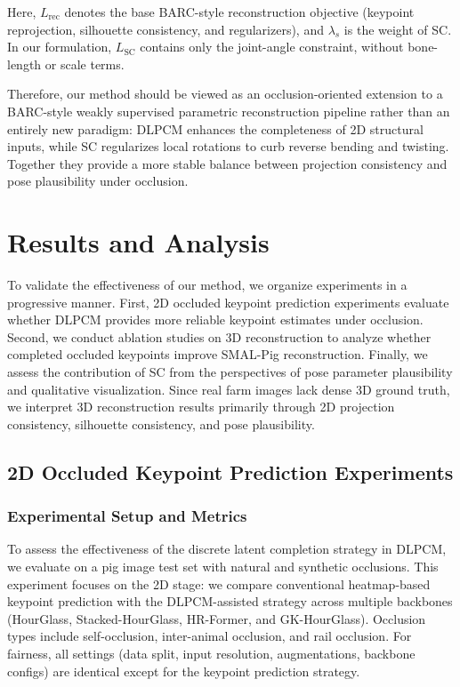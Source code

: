 \documentclass[computers,article,submit,pdftex,moreauthors]{Definitions/mdpi}
\begin{document}
Here, $L_{\text{rec}}$ denotes the base BARC-style reconstruction objective (keypoint reprojection, silhouette consistency, and regularizers), and $\lambda_s$ is the weight of SC. In our formulation, $L_{\text{SC}}$ contains only the joint-angle constraint, without bone-length or scale terms.

Therefore, our method should be viewed as an occlusion-oriented extension to a BARC-style weakly supervised parametric reconstruction pipeline rather than an entirely new paradigm: DLPCM enhances the completeness of 2D structural inputs, while SC regularizes local rotations to curb reverse bending and twisting. Together they provide a more stable balance between projection consistency and pose plausibility under occlusion.

\section{Results and Analysis}\label{sec:results}

To validate the effectiveness of our method, we organize experiments in a progressive manner. First, 2D occluded keypoint prediction experiments evaluate whether DLPCM provides more reliable keypoint estimates under occlusion. Second, we conduct ablation studies on 3D reconstruction to analyze whether completed occluded keypoints improve SMAL-Pig reconstruction. Finally, we assess the contribution of SC from the perspectives of pose parameter plausibility and qualitative visualization. Since real farm images lack dense 3D ground truth, we interpret 3D reconstruction results primarily through 2D projection consistency, silhouette consistency, and pose plausibility.

\subsection{2D Occluded Keypoint Prediction Experiments}\label{sec:2d_keypoint}

\subsubsection{Experimental Setup and Metrics}\label{sec:2d_setup}

To assess the effectiveness of the discrete latent completion strategy in DLPCM, we evaluate on a pig image test set with natural and synthetic occlusions. This experiment focuses on the 2D stage: we compare conventional heatmap-based keypoint prediction with the DLPCM-assisted strategy across multiple backbones (HourGlass, Stacked-HourGlass, HR-Former, and GK-HourGlass). Occlusion types include self-occlusion, inter-animal occlusion, and rail occlusion. For fairness, all settings (data split, input resolution, augmentations, backbone configs) are identical except for the keypoint prediction strategy.
\end{document}
